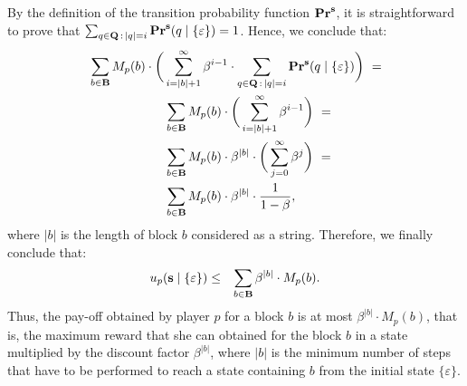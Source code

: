 By the definition of the transition probability function $\mathbf{Pr}^{\mathbf{s}}$, it is straightforward to prove that $\sum_{q \in \mathbf{Q} \,:\, |q| = i} \mathbf{Pr}^{\mathbf{s}}(q \mid \{\varepsilon\}) = 1$. Hence, we conclude that:
\begin{align*}
&\sum_{b \in \mathbf{B}} M_p(b) \cdot\bigg(\sum_{i=|b|+1}^\infty \beta^{i-1} \cdot \sum_{q \in \mathbf{Q} \,:\, |q| = i} \mathbf{Pr}^{\mathbf{s}}(q \mid \{\varepsilon\})\bigg) \ = \\
&\hspace{60pt}  \sum_{b \in \mathbf{B}} M_p(b) \cdot\bigg(\sum_{i=|b|+1}^\infty \beta^{i-1}\bigg) \ = \\
&\hspace{60pt}  \sum_{b \in \mathbf{B}} M_p(b) \cdot \beta^{|b|} \cdot \bigg(\sum_{j=0}^\infty \beta^{j}\bigg) \ = \\
&\hspace{60pt}  \sum_{b \in \mathbf{B}} M_p(b) \cdot \beta^{|b|} \cdot \frac{1}{1-\beta},
\end{align*}
where $|b|$ is the length of block $b$ considered as a string. Therefore, we finally conclude that:
\begin{eqnarray*}
u_p(\mathbf{s} \mid \{\varepsilon\}) & \leq &  \sum_{b \in \mathbf{B}} \beta^{|b|} \cdot M_p(b).
\end{eqnarray*}
Thus, the pay-off obtained by player $p$ for a block $b$ is at most $\beta^{|b|} \cdot M_p(b)$, that is, the maximum reward that she can obtained for the block $b$ in a state multiplied by the discount factor $\beta^{|b|}$, where $|b|$ is the minimum number of steps that have to be performed to reach a state containing $b$ from the initial state $\{\varepsilon\}$.





